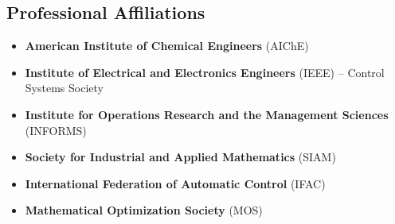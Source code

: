 \subsection*{Professional Affiliations}
\begin{itemize}[leftmargin=*,itemsep=0pt]
\item[] \textbf{American Institute of Chemical Engineers} (AIChE)
\item[] \textbf{Institute of Electrical and Electronics Engineers} (IEEE) -- Control Systems Society
\item[] \textbf{Institute for Operations Research and the Management Sciences} (INFORMS)
\item[] \textbf{Society for Industrial and Applied Mathematics} (SIAM)
\item[] \textbf{International Federation of Automatic Control} (IFAC)
\item[] \textbf{Mathematical Optimization Society} (MOS)
\end{itemize}
\let\OLDthebibliography\thebibliography
\renewcommand\thebibliography[1]{
  \OLDthebibliography{#1}
  \setlength{\parskip}{0pt}
  \setlength{\itemsep}{0pt}
}
